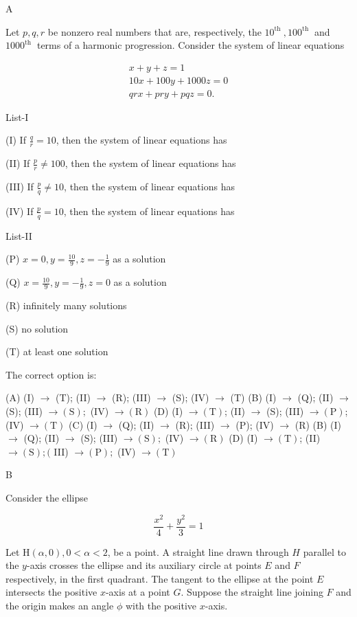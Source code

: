 A

Let $p, q, r$ be nonzero real numbers that are, respectively, the $10^{\text {th }}, 100^{\text {th }}$ and $1000^{\text {th }}$ terms of a harmonic progression. Consider the system of linear equations

$$
\begin{gathered}
x+y+z=1 \\
10 x+100 y+1000 z=0 \\
q r x+p r y+p q z=0 .
\end{gathered}
$$

List-I

(I) If $\frac{q}{r}=10$, then the system of linear equations has

(II) If $\frac{p}{r} \neq 100$, then the system of linear equations has

(III) If $\frac{p}{q} \neq 10$, then the system of linear equations has

(IV) If $\frac{p}{q}=10$, then the system of linear equations has

List-II

(P) $x=0, y=\frac{10}{9}, z=-\frac{1}{9}$ as a solution

(Q) $x=\frac{10}{9}, y=-\frac{1}{9}, z=0$ as a solution

(R) infinitely many solutions

(S) no solution

(T) at least one solution

The correct option is:

(A) (I) $\rightarrow$ (T); (II) $\rightarrow$ (R); (III) $\rightarrow$ (S); (IV) $\rightarrow$ (T)
(B) (I) $\rightarrow$ (Q); (II) $\rightarrow$ (S); (III) $\rightarrow(\mathrm{S}) ;$ (IV) $\rightarrow(\mathrm{R})$
(D) (I) $\rightarrow(\mathrm{T})$; (II) $\rightarrow$ (S); (III) $\rightarrow(\mathrm{P})$; (IV) $\rightarrow(\mathrm{T})$
(C) (I) $\rightarrow$ (Q); (II) $\rightarrow$ (R); (III) $\rightarrow$ (P); (IV) $\rightarrow$ (R)
(B) (I) $\rightarrow$ (Q); (II) $\rightarrow$ (S); (III) $\rightarrow(\mathrm{S}) ;$ (IV) $\rightarrow(\mathrm{R})$
(D) (I) $\rightarrow(\mathrm{T})$; (II) $\rightarrow(\mathrm{S}) ;($ III) $\rightarrow(\mathrm{P}) ;$ (IV) $\rightarrow(\mathrm{T})$

B

Consider the ellipse

$$
\frac{x^{2}}{4}+\frac{y^{2}}{3}=1
$$

Let $\mathrm{H}(\alpha, 0), 0<\alpha<2$, be a point. A straight line drawn through $H$ parallel to the $y$-axis crosses the ellipse and its auxiliary circle at points $E$ and $F$ respectively, in the first quadrant. The tangent to the ellipse at the point $E$ intersects the positive $x$-axis at a point $G$. Suppose the straight line joining $F$ and the origin makes an angle $\phi$ with the positive $x$-axis.

